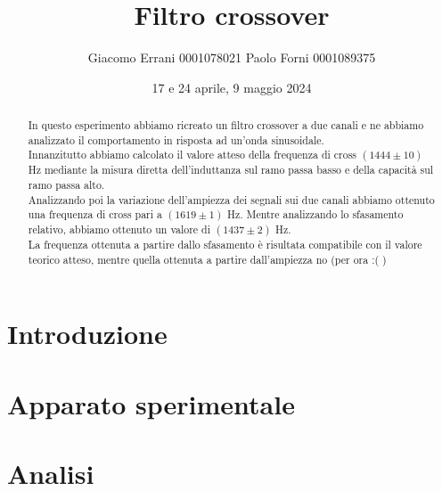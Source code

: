 \documentclass[12pt,a4paper]{article}
\title{Filtro crossover} %
\date{17 e 24 aprile, 9 maggio 2024}
\author{Giacomo Errani 0001078021 Paolo Forni 0001089375}
\begin{document}

\newcommand{\numberthis}{\addtocounter{equation}{1}\tag{\theequatio}}

\newcommand{\theoryF}{ $(1444 \pm 10)$ Hz}
\newcommand{\amplitudeF}{$(1619 \pm 1)$ Hz}
\newcommand{\phaseF}{$(1437 \pm 2)$ Hz}

\maketitle

\begin{abstract}

  In questo esperimento abbiamo ricreato un filtro crossover a due canali e ne abbiamo analizzato il comportamento
  in risposta ad un'onda sinusoidale. \\
  Innanzitutto abbiamo calcolato il valore atteso della frequenza di cross \theoryF \hspace{1pt} mediante la misura
  diretta dell'induttanza sul ramo passa basso e della capacità sul ramo passa alto. \\
  Analizzando poi la variazione dell'ampiezza dei segnali sui due canali abbiamo ottenuto una frequenza di cross pari a
  \amplitudeF. Mentre analizzando lo sfasamento relativo, abbiamo ottenuto un valore di \phaseF. \\
  La frequenza ottenuta a partire dallo sfasamento è risultata compatibile con il valore teorico atteso, mentre quella
  ottenuta a partire dall'ampiezza no (per ora :( )

\end{abstract}


\section{Introduzione}\label{sec:introduzione}

  


\section{Apparato sperimentale}\label{sec:apparato-sperimentale}

  


\section{Analisi}\label{sec:analisi}
\end{document}
